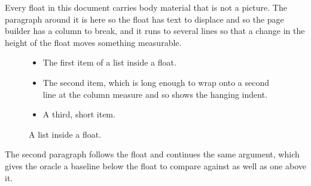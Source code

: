 \documentclass{article}
\begin{document}
Every float in this document carries body material that is not a
picture. The paragraph around it is here so the float has text to displace and
so the page builder has a column to break, and it runs to several lines so that
a change in the height of the float moves something measurable.

\begin{figure}[h]
\begin{itemize}
\item The first item of a list inside a float.
\item The second item, which is long enough to wrap onto a second line at the
column measure and so shows the hanging indent.
\item A third, short item.
\end{itemize}
\caption{A list inside a float.}
\end{figure}

The second paragraph follows the float and continues the same
argument, which gives the oracle a baseline below the float to compare against
as well as one above it.
\end{document}
